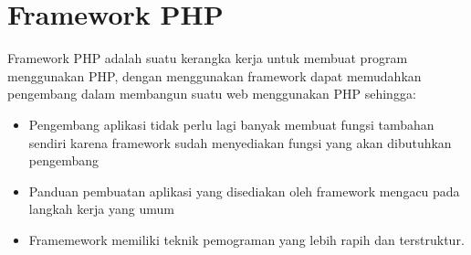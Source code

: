 \section{Framework PHP}
Framework PHP adalah suatu kerangka kerja untuk membuat program menggunakan PHP, dengan menggunakan framework dapat memudahkan pengembang dalam membangun suatu web menggunakan PHP sehingga:
\begin{itemize}
\item Pengembang aplikasi tidak perlu lagi banyak membuat fungsi tambahan sendiri karena framework sudah menyediakan fungsi yang akan dibutuhkan pengembang
\item Panduan pembuatan aplikasi yang disediakan oleh framework mengacu pada langkah kerja yang umum
\item Framemework memiliki teknik pemograman yang lebih rapih dan terstruktur.
\end{itemize}
